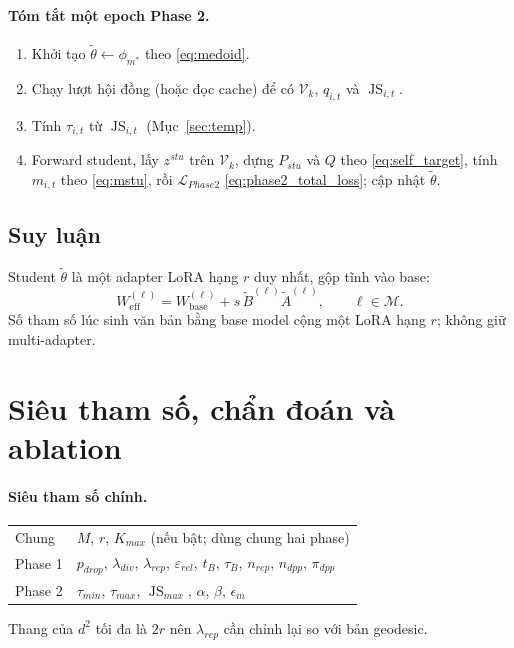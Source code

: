 \documentclass[12pt,a4paper]{article}
\theoremstyle{plain}
\DeclareMathOperator{\JS}{JS}
\newcommand{\Vk}{\mathcal V_k}
\begin{document}
\paragraph{Tóm tắt một epoch Phase 2.}
\begin{enumerate}
\item Khởi tạo $\tilde\theta\leftarrow\phi_{m^*}$ theo \eqref{eq:medoid}.
\item Chạy lượt hội đồng (hoặc đọc cache) để có $\Vk$, $q_{i,t}$ và $\JS_{i,t}$.
\item Tính $\tau_{i,t}$ từ $\JS_{i,t}$ (Mục~\ref{sec:temp}).
\item Forward student, lấy $z^{stu}$ trên $\Vk$, dựng $P_{stu}$ và $Q$ theo \eqref{eq:self_target}, tính $m_{i,t}$ theo \eqref{eq:mstu}, rồi $\mathcal L_{Phase2}$ \eqref{eq:phase2_total_loss}; cập nhật $\tilde\theta$.
\end{enumerate}

\subsection{Suy luận}
\label{sec:inference}

Student $\tilde\theta$ là một adapter LoRA hạng $r$ duy nhất, gộp tĩnh vào base:
\begin{equation}
\label{eq:weffstudent}
W_{\mathrm{eff}}^{(\ell)}=W_{\mathrm{base}}^{(\ell)}+s\,\tilde B^{(\ell)}\tilde A^{(\ell)},\qquad\ell\in\mathcal M.
\end{equation}
Số tham số lúc sinh văn bản bằng base model cộng một LoRA hạng $r$; không giữ multi-adapter.

\section{Siêu tham số, chẩn đoán và ablation}
\label{sec:hyper}

\paragraph{Siêu tham số chính.}
\begin{center}
\begin{tabularx}{\textwidth}{@{}lX@{}}
\toprule
Chung & $M$, $r$, $K_{max}$ (nếu bật; dùng chung hai phase) \\
Phase 1 & $p_{drop}$, $\lambda_{div}$, $\lambda_{rep}$, $\varepsilon_{rel}$, $t_B$, $\tau_B$, $n_{rep}$, $n_{dpp}$, $\pi_{dpp}$ \\
Phase 2 & $\tau_{min}$, $\tau_{max}$, $\JS_{max}$, $\alpha$, $\beta$, $\epsilon_m$ \\
\bottomrule
\end{tabularx}
\end{center}
Thang của $d^2$ tối đa là $2r$ nên $\lambda_{rep}$ cần chỉnh lại so với bản geodesic.
\end{document}
